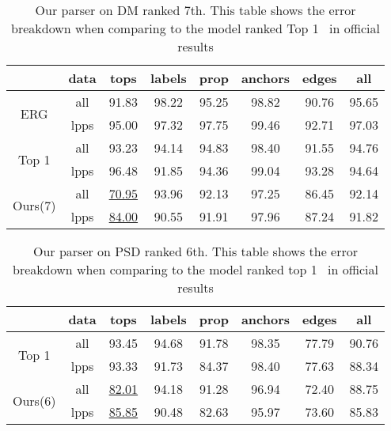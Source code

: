 \begin{table}[!tbp]
\caption{\label{tbl:results_dm} Our parser on DM ranked 7th. This table shows the error breakdown when comparing to the model ranked Top 1~\citep{Li:Zha:Zha:19} in official results}
\small
\centering
\setlength{\tabcolsep}{2.5pt}
\begin{tabular}{cccccccc}
  \toprule
                            & data & tops              & labels & prop  & anchors & edges & all   \\ \hline
  \multirow{2}{*}{ ERG }    & all  & 91.83             & 98.22  & 95.25 & 98.82   & 90.76 & 95.65 \\
                            & lpps & 95.00             & 97.32  & 97.75 & 99.46   & 92.71 & 97.03 \\
  \multirow{2}{*}{Top 1}    & all  & 93.23             & 94.14  & 94.83 & 98.40   & 91.55 & 94.76 \\
                            & lpps & 96.48             & 91.85  & 94.36 & 99.04   & 93.28 & 94.64 \\
  \multirow{2}{*}{ Ours(7)} & all  & \underline{70.95} & 93.96  & 92.13 & 97.25   & 86.45 & 92.14 \\
                            & lpps & \underline{84.00} & 90.55  & 91.91 & 97.96   & 87.24 & 91.82 \\ \bottomrule
\end{tabular}
\end{table}



\begin{table}[!tbp]
\caption{\label{tbl:results_psd} Our parser on PSD ranked 6th. This table shows the error breakdown when comparing to the model ranked top 1~\cite{Don:Fow:Gro:19} in official results}
\small
\centering
\setlength{\tabcolsep}{2.5pt}
\begin{tabular}{cccccccc}
\toprule
                          & data & tops              & labels & prop  & anchors & edges & all   \\ \hline
\multirow{2}{*}{Top 1}   & all  & 93.45             & 94.68  & 91.78 & 98.35   & 77.79 & 90.76 \\
                          & lpps & 93.33             & 91.73  & 84.37 & 98.40   & 77.63 & 88.34 \\
\multirow{2}{*}{ Ours(6)} & all  & \underline{82.01} & 94.18  & 91.28 & 96.94   & 72.40 & 88.75 \\
                          & lpps & \underline{85.85} & 90.48  & 82.63 & 95.97   & 73.60 & 85.83 \\ \bottomrule
\end{tabular}
\end{table}

